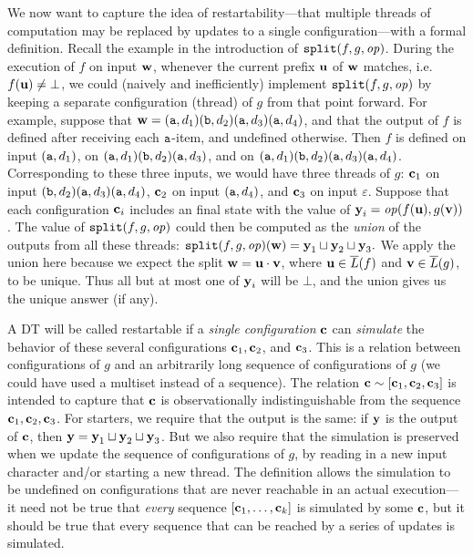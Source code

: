 We now want to capture the idea of restartability---that multiple threads of computation may be replaced by updates to a single configuration---with a formal definition. Recall the example in the introduction of $\texttt{split}(f,g,\mathit{op})$.
During the execution of $f$ on input $\textbf{w}$, whenever the current prefix $\textbf{u}$ of $\textbf{w}$ matches, i.e. $f(\textbf{u}) \ne \bot$, we could (naively and inefficiently) implement $\texttt{split}(f,g,\mathit{op})$ by keeping a separate configuration (thread) of $g$ from that point forward. For example, suppose that $\textbf{w} = ({\texttt{a}}, d_1) ({\texttt{b}}, d_2) ({\texttt{a}}, d_3) ({\texttt{a}}, d_4)$, and that the output of $f$ is defined after receiving each ${\texttt{a}}$-item, and undefined otherwise. Then $f$ is defined on input $({\texttt{a}}, d_1)$, on $({\texttt{a}}, d_1)({\texttt{b}}, d_2)({\texttt{a}}, d_3)$, and on $({\texttt{a}}, d_1)({\texttt{b}}, d_2)({\texttt{a}}, d_3)({\texttt{a}}, d_4)$. Corresponding to these three inputs, we would have three threads of $g$: $\textbf{c}_1$ on input $({\texttt{b}}, d_2) ({\texttt{a}}, d_3) ({\texttt{a}}, d_4)$, $\textbf{c}_2$ on input $({\texttt{a}}, d_4)$, and $\textbf{c}_3$ on input $\varepsilon$. Suppose that each configuration $\textbf{c}_i$ includes an final state with the value of $\textbf{y}_i = \mathit{op}(f(\textbf{u}),g(\textbf{v}))$.
The value of $\texttt{split}(f,g,\mathit{op})$ could then be computed as the \emph{union} of the outputs from all these threads:
$\texttt{split}(f,g,\mathit{op})(\textbf{w}) = \textbf{y}_1 \sqcup \textbf{y}_2 \sqcup \textbf{y}_3.$
We apply the union here because we expect the split $\textbf{w} = \textbf{u} \cdot \textbf{v}$, where $\textbf{u} \in \overline{L}(f)$ and $\textbf{v} \in \overline{L}(g)$, to be unique. Thus all but at most one of $\textbf{y}_i$ will be $\bot$, and the union gives us the unique answer (if any).

A DT will be called restartable if a \emph{single configuration} $\textbf{c}$ can \emph{simulate} the behavior of these several configurations $\textbf{c}_1, \textbf{c}_2$, and $\textbf{c}_3$. This is a relation between configurations of $g$ and an arbitrarily long sequence of configurations of $g$ (we could have used a multiset instead of a sequence). The relation $\textbf{c} \sim [\textbf{c}_1, \textbf{c}_2, \textbf{c}_3]$ is intended to capture that $\textbf{c}$ is observationally indistinguishable from the sequence $\textbf{c}_1, \textbf{c}_2, \textbf{c}_3$. For starters, we require that the output is the same: if $\textbf{y}$ is the output of $\textbf{c}$, then $\textbf{y} = \textbf{y}_1 \sqcup \textbf{y}_2 \sqcup \textbf{y}_3$. But we also require that the simulation is preserved when we update the sequence of configurations of $g$, by reading in a new input character and/or starting a new thread. The definition allows the simulation to be undefined on configurations that are never reachable in an actual execution---it need not be true that \emph{every} sequence $[\textbf{c}_1, \ldots, \textbf{c}_k]$ is simulated by some $\textbf{c}$, but it should be true that every sequence that can be reached by a series of updates is simulated.

